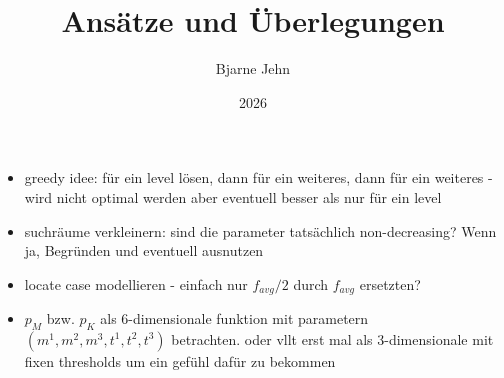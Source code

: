 \documentclass{article}
\title{Ansätze und Überlegungen}
\author{Bjarne Jehn}
\date{2026}
\begin{document}
	
\maketitle

\begin{itemize}
	\item greedy idee: für ein level lösen, dann für ein weiteres, dann für ein weiteres - wird nicht optimal werden aber eventuell besser als nur für ein level
	\item suchräume verkleinern: sind die parameter tatsächlich non-decreasing? Wenn ja, Begründen und eventuell ausnutzen
	\item locate case modellieren - einfach nur $f_{avg}/2$ durch $f_{avg}$ ersetzten?
	\item $p_M$ bzw. $p_K$ als 6-dimensionale funktion mit parametern $(m^1,m^2,m^3,t^1,t^2,t^3)$ betrachten. oder vllt erst mal als 3-dimensionale mit fixen thresholds um ein gefühl dafür zu bekommen
\end{itemize}
	
	
\end{document}

